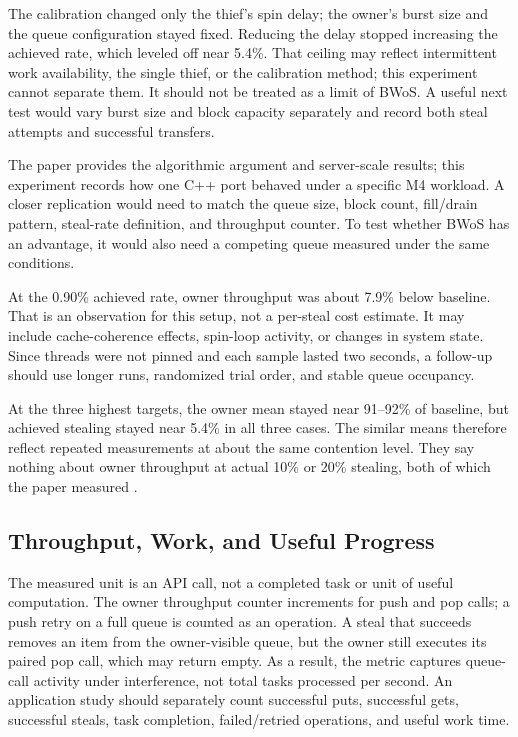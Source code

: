 \documentclass[conference]{IEEEtran}
\begin{document}
The calibration changed only the thief's spin delay; the owner's burst size and the queue configuration stayed fixed. Reducing the delay stopped increasing the achieved rate, which leveled off near 5.4\%. That ceiling may reflect intermittent work availability, the single thief, or the calibration method; this experiment cannot separate them. It should not be treated as a limit of BWoS. A useful next test would vary burst size and block capacity separately and record both steal attempts and successful transfers.

The paper provides the algorithmic argument and server-scale results; this experiment records how one C++ port behaved under a specific M4 workload. A closer replication would need to match the queue size, block count, fill/drain pattern, steal-rate definition, and throughput counter. To test whether BWoS has an advantage, it would also need a competing queue measured under the same conditions.

At the 0.90\% achieved rate, owner throughput was about 7.9\% below baseline. That is an observation for this setup, not a per-steal cost estimate. It may include cache-coherence effects, spin-loop activity, or changes in system state. Since threads were not pinned and each sample lasted two seconds, a follow-up should use longer runs, randomized trial order, and stable queue occupancy.

At the three highest targets, the owner mean stayed near 91--92\% of baseline, but achieved stealing stayed near 5.4\% in all three cases. The similar means therefore reflect repeated measurements at about the same contention level. They say nothing about owner throughput at actual 10\% or 20\% stealing, both of which the paper measured \cite{wang2023bwos}.

\subsection{Throughput, Work, and Useful Progress}
The measured unit is an API call, not a completed task or unit of useful computation. The owner throughput counter increments for push and pop calls; a push retry on a full queue is counted as an operation. A steal that succeeds removes an item from the owner-visible queue, but the owner still executes its paired pop call, which may return empty. As a result, the metric captures queue-call activity under interference, not total tasks processed per second. An application study should separately count successful puts, successful gets, successful steals, task completion, failed/retried operations, and useful work time.
\end{document}
